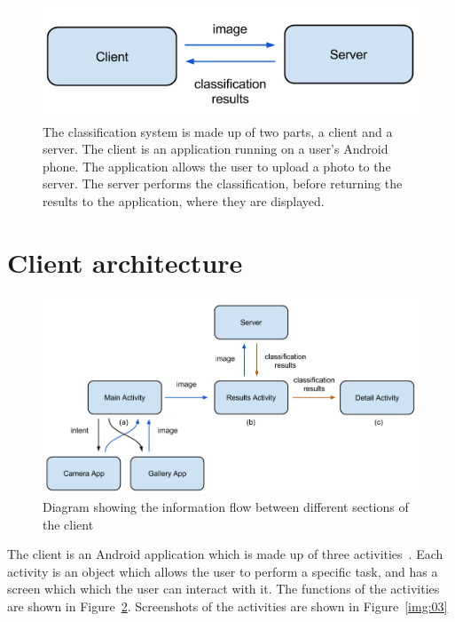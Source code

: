 \documentclass[11pt, a4paper]{report}
\begin{document}
\begin{figure}[h]
	\centering
  \includegraphics[totalheight=3cm]{img/11.png}
  \caption{The classification system is made up of two parts, a client and a server. The client is an application running on a user's Android phone. The application allows the user to upload a photo to the server. The server performs the classification, before returning the results to the application, where they are displayed.}
  \label{img:11}
\end{figure}


\section{Client architecture} 

\begin{figure}[h]
	\centering
  \includegraphics[totalheight=9cm]{img/12.png}
  \caption{Diagram showing the information flow between different sections of the client}
  \label{img:12}
\end{figure}

The client is an Android application which is made up of three activities~\cite{AndroidDev:Activity}. Each activity is an object which allows the user to perform a specific task, and has a screen which which the user can interact with it. The functions of the activities are shown in Figure~\ref{img:12}. Screenshots of the activities are shown in Figure~\ref{img:03} 
\end{document}
